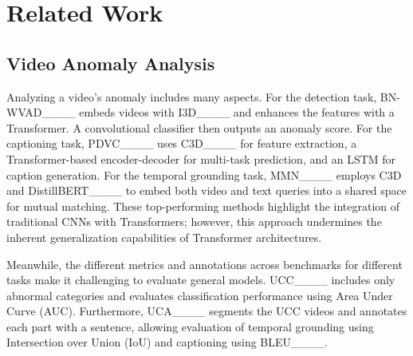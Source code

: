 \section{Related Work}
\label{sec:related_work}
 \subsection{Video Anomaly Analysis} 
   Analyzing a video's anomaly includes many aspects.
 For the detection task, BN-WVAD____ embeds videos with I3D____ and enhances the features with a Transformer. A convolutional classifier then outputs an anomaly score.
 For the captioning task, PDVC____ uses C3D____ for feature extraction, a Transformer-based encoder-decoder for multi-task prediction, and an LSTM for caption generation.
 For the temporal grounding task, MMN____ employs C3D and DistillBERT____ to embed both video and text queries into a shared space for mutual matching.
These top-performing methods highlight the integration of traditional CNNs with Transformers; however, this approach undermines the inherent generalization capabilities of Transformer architectures.
 
 Meanwhile, the different metrics and annotations across benchmarks for different tasks make it challenging to evaluate general models.
 UCC____ includes only abnormal categories and evaluates classification performance using Area Under Curve (AUC). Furthermore, UCA____ segments the UCC videos and annotates each part with a sentence, allowing evaluation of temporal grounding using Intersection over Union (IoU) and captioning using BLEU____.




